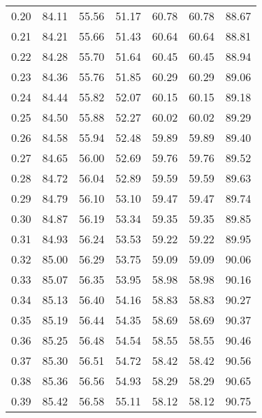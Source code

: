 \begin{tabular}{|c|c|c|c|c|c|c|}
      0.20 &     84.11 &     55.56 &      51.17 &   60.78 &      60.78 &         88.67 \\
      0.21 &     84.21 &     55.66 &      51.43 &   60.64 &      60.64 &         88.81 \\
      0.22 &     84.28 &     55.70 &      51.64 &   60.45 &      60.45 &         88.94 \\
      0.23 &     84.36 &     55.76 &      51.85 &   60.29 &      60.29 &         89.06 \\
      0.24 &     84.44 &     55.82 &      52.07 &   60.15 &      60.15 &         89.18 \\
      0.25 &     84.50 &     55.88 &      52.27 &   60.02 &      60.02 &         89.29 \\
      0.26 &     84.58 &     55.94 &      52.48 &   59.89 &      59.89 &         89.40 \\
      0.27 &     84.65 &     56.00 &      52.69 &   59.76 &      59.76 &         89.52 \\
      0.28 &     84.72 &     56.04 &      52.89 &   59.59 &      59.59 &         89.63 \\
      0.29 &     84.79 &     56.10 &      53.10 &   59.47 &      59.47 &         89.74 \\
      0.30 &     84.87 &     56.19 &      53.34 &   59.35 &      59.35 &         89.85 \\
      0.31 &     84.93 &     56.24 &      53.53 &   59.22 &      59.22 &         89.95 \\
      0.32 &     85.00 &     56.29 &      53.75 &   59.09 &      59.09 &         90.06 \\
      0.33 &     85.07 &     56.35 &      53.95 &   58.98 &      58.98 &         90.16 \\
      0.34 &     85.13 &     56.40 &      54.16 &   58.83 &      58.83 &         90.27 \\
      0.35 &     85.19 &     56.44 &      54.35 &   58.69 &      58.69 &         90.37 \\
      0.36 &     85.25 &     56.48 &      54.54 &   58.55 &      58.55 &         90.46 \\
      0.37 &     85.30 &     56.51 &      54.72 &   58.42 &      58.42 &         90.56 \\
      0.38 &     85.36 &     56.56 &      54.93 &   58.29 &      58.29 &         90.65 \\
      0.39 &     85.42 &     56.58 &      55.11 &   58.12 &      58.12 &         90.75 \\

\end{tabular}
